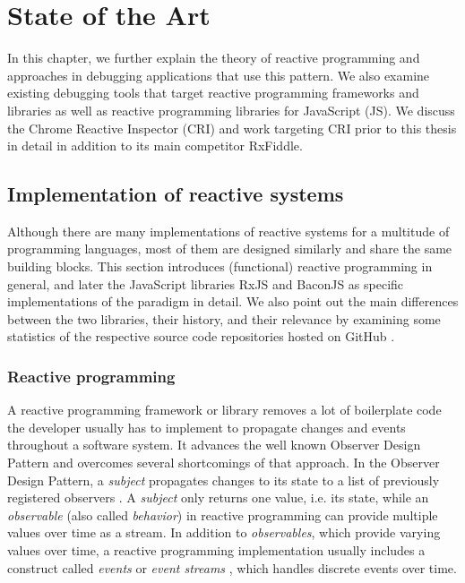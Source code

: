 \chapter{State of the Art}
\label{ch:StateOfTheArt}
In this chapter, we further explain the theory of reactive programming and approaches in debugging applications that use this pattern. We also examine existing debugging tools that target reactive programming frameworks and libraries as well as reactive programming libraries for JavaScript (JS). We discuss the Chrome Reactive Inspector (CRI) and work targeting CRI prior to this thesis in detail in addition to its main competitor RxFiddle.

\section{Implementation of reactive systems}
Although there are many implementations of reactive systems for a multitude of programming languages, most of them are designed similarly and share the same building blocks. This section introduces (functional) reactive programming in general, and later the JavaScript libraries RxJS and BaconJS as specific implementations of the paradigm in detail. We also point out the main differences between the two libraries, their history, and their relevance by examining some statistics of the respective source code repositories hosted on GitHub \cite{RxJSRepo} \cite{BaconJSRepo}.

	\subsection{Reactive programming}
	A reactive programming framework or library removes a lot of boilerplate code the developer usually has to implement to propagate changes and events throughout a software system. It advances the well known Observer Design Pattern and overcomes several shortcomings of that approach. In the Observer Design Pattern, a \emph{subject} propagates changes to its state to a list of previously registered observers \cite{FRP}. A \emph{subject} only returns one value, i.e. its state, while an \emph{observable} (also called \emph{behavior}) in reactive programming can provide multiple values over time as a stream.
	In addition to \emph{observables}, which provide varying values over time, a reactive programming implementation usually includes a construct called \emph{events} or \emph{event streams} \cite{BaconJS}, which handles discrete events over time.
	

